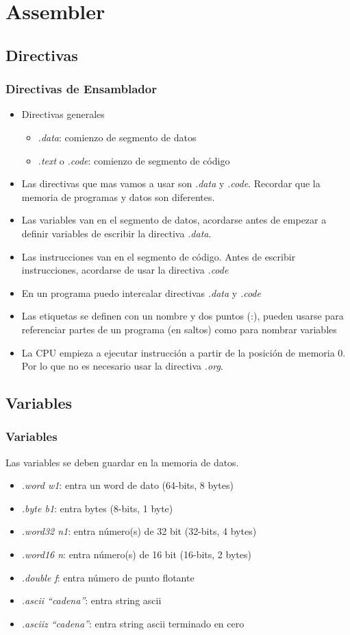 \documentclass{beamer}
\begin{document}
\section{Assembler}
\subsection{Directivas}
\begin{frame}
\frametitle{Directivas de Ensamblador}
\begin{itemize}
\item Directivas generales
\begin{itemize}
\item \emph{.data}: comienzo de segmento de datos
\item \emph{.text} o \emph{.code}: comienzo de segmento de código
\end{itemize}
\item Las directivas que mas vamos a usar son \emph{.data} y \emph{.code}. Recordar que la memoria de programas y datos son diferentes.
\item Las variables van en el segmento de datos, acordarse antes de empezar a definir variables de escribir la directiva \emph{.data}.
\item Las instrucciones van en el segmento de código. Antes de escribir instrucciones, acordarse de usar la directiva \emph{.code}
\item En un programa puedo intercalar directivas \emph{.data} y \emph{.code}
\item Las etiquetas se definen con un nombre y dos puntos (:), pueden usarse para referenciar partes de un programa (en saltos) como para nombrar variables
\item La CPU empieza a ejecutar instrucción a partir de la posición de memoria 0. Por lo que no es necesario usar la directiva \emph{.org}.
\end{itemize}
\end{frame}

\subsection{Variables}
\begin{frame}
\frametitle{Variables}
Las variables se deben guardar en la memoria de datos.
\begin{itemize}
\item \emph{.word w1}: entra un word de dato (64-bits, 8 bytes)
\item \emph{.byte b1}: entra bytes (8-bits, 1 byte)
\item \emph{.word32 n1}: entra número(s) de 32 bit (32-bits, 4 bytes)
\item \emph{.word16 n}: entra número(s) de 16 bit (16-bits, 2 bytes)
\item \emph{.double f}: entra número de punto flotante
\item \emph{.ascii ``cadena''}: entra string ascii
\item \emph{.asciiz ``cadena''}:  entra string ascii terminado en cero
\end{itemize}
\end{frame}
\end{document}
